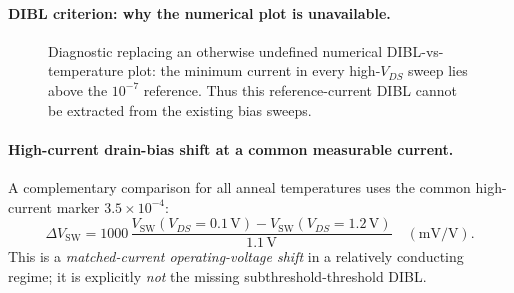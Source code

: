\paragraph{DIBL criterion: why the numerical plot is unavailable.}
\begin{figure}[H]\centering
{}
\caption{Diagnostic replacing an otherwise undefined numerical
DIBL-vs-temperature plot: the minimum current in every high-$V_{DS}$
sweep lies above the $10^{-7}$ reference. Thus this reference-current
DIBL cannot be extracted from the existing bias sweeps.}
\end{figure}

\paragraph{High-current drain-bias shift at a common measurable current.}
A complementary comparison for all anneal temperatures uses
the common high-current marker $3.5\times10^{-4}$:
\[
\Delta V_{\mathrm{SW}}=
1000\,\frac{V_{\mathrm{SW}}(V_{DS}=0.1\mathrm{\,V})-
V_{\mathrm{SW}}(V_{DS}=1.2\mathrm{\,V})}{1.1\mathrm{\,V}}
\quad(\mathrm{mV/V}).
\]
This is a \emph{matched-current operating-voltage shift}
in a relatively conducting regime; it is explicitly
\emph{not} the missing subthreshold-threshold DIBL.

